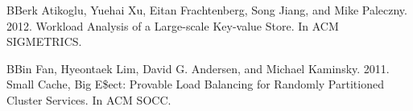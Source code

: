 \documentclass[11pt,twoside,twocolumn]{article}
\begin{document}

\begin{thebibliography}{99} %

\bibitem[1]
BBerk Atikoglu, Yuehai Xu, Eitan Frachtenberg, Song Jiang, and Mike
Paleczny. 2012. Workload Analysis of a Large-scale Key-value Store.
In ACM SIGMETRICS.

\bibitem[2]
BBin Fan, Hyeontaek Lim, David G. Andersen, and Michael Kaminsky.
2011. Small Cache, Big E\$ect: Provable Load Balancing for Randomly
Partitioned Cluster Services. In ACM SOCC.
 
\end{thebibliography}

\end{document}

